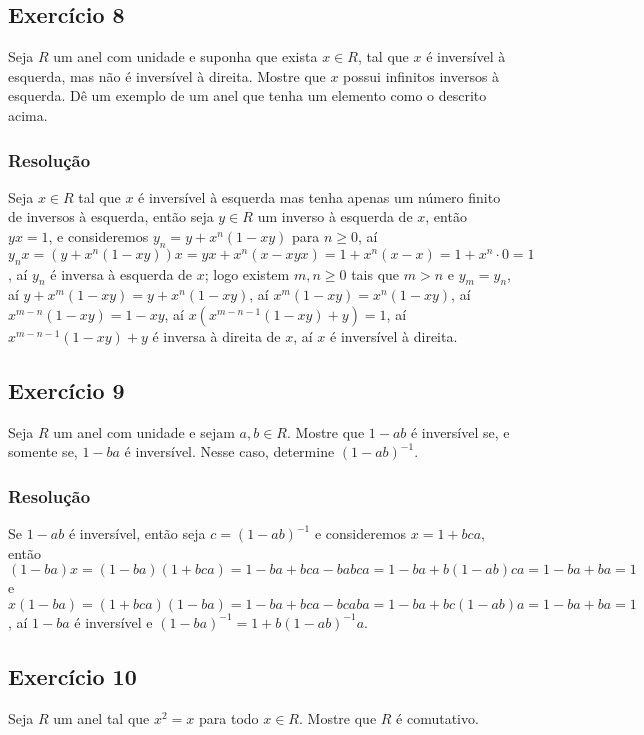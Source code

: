 \documentclass[10pt,a4paper]{article}
\begin{document}
\subsection*{Exercício 8}

Seja $R$ um anel com unidade e suponha que exista $x\in R$, tal que $x$ é inversível à esquerda, mas não é inversível à direita. Mostre que $x$ possui infinitos inversos à esquerda. Dê um exemplo de um anel que tenha um elemento como o descrito acima.

\subsubsection*{Resolução}

Seja $x\in R$ tal que $x$ é inversível à esquerda mas tenha apenas um número finito de inversos à esquerda, então seja $y\in R$ um inverso à esquerda de $x$, então $yx=1$, e consideremos $y_n=y+x^n(1-xy)$ para $n\geq 0$, aí $y_nx=(y+x^n(1-xy))x=yx+x^n(x-xyx)=1+x^n(x-x)=1+x^n\cdot 0=1$, aí $y_n$ é inversa à esquerda de $x$; logo existem $m,n\geq 0$ tais que $m>n$ e $y_m=y_n$, aí $y+x^m(1-xy)=y+x^n(1-xy)$, aí $x^m(1-xy)=x^n(1-xy)$, aí $x^{m-n}(1-xy)=1-xy$, aí $x(x^{m-n-1}(1-xy)+y)=1$, aí $x^{m-n-1}(1-xy)+y$ é inversa à direita de $x$, aí $x$ é inversível à direita.

\subsection*{Exercício 9}

Seja $R$ um anel com unidade e sejam $a,b\in R$. Mostre que $1-ab$ é inversível se, e somente se, $1-ba$ é inversível. Nesse caso, determine $(1-ab)^{-1}$.

\subsubsection*{Resolução}

Se $1-ab$ é inversível, então seja $c=(1-ab)^{-1}$ e consideremos $x=1+bca$, então $(1-ba)x=(1-ba)(1+bca)=1-ba+bca-babca=1-ba+b(1-ab)ca=1-ba+ba=1$ e $x(1-ba)=(1+bca)(1-ba)=1-ba+bca-bcaba=1-ba+bc(1-ab)a=1-ba+ba=1$, aí $1-ba$ é inversível e $(1-ba)^{-1}=1+b(1-ab)^{-1}a$.

\subsection*{Exercício 10}

Seja $R$ um anel tal que $x^2=x$ para todo $x\in R$. Mostre que $R$ é comutativo.
\end{document}
